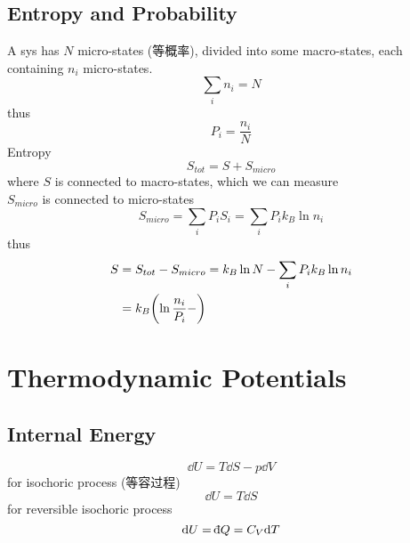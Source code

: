 \documentclass[UTF8]{ctexart} %
\newcommand{\dbar}{{\mathchar'26\mkern-11mu\mathrm{d}}}
\numberwithin{equation}{subsection}
\begin{document}
\subsection{}
\subsection{Entropy and Probability}
A sys has $N$ micro-states (等概率), divided into some macro-states, each containing $n_i$ micro-states.
\begin{equation}\label{key}
\sum_i n_i = N
\end{equation}
thus
\begin{equation}\label{key}
P_i = \dfrac{n_i}{N}
\end{equation}
Entropy
\begin{equation}\label{key}
S_{tot} = S + S_{micro}
\end{equation}
where $S$ is connected to macro-states, which we can measure\\
$S_{micro}$ is connected to micro-states
\begin{equation}\label{key}
S_{micro} = \sum_i P_i S_i = \sum_i P_i k_B \ln n_i
\end{equation}
thus
\begin{equation}\label{key}
\begin{aligned}
S &= S_{tot} - S_{micro} = k_B \ln N - \sum_i P_i k_B \ln n_i\\
&=k_B\qty(\ln\dfrac{n_i}{P_i} - )
\end{aligned}
\end{equation}

\section{}

\section{Thermodynamic Potentials}
\subsection{Internal Energy}
\begin{equation}\label{key}
\dd U = T\dd S - p\dd V
\end{equation}
for isochoric process (等容过程)
\begin{equation}\label{key}
\dd U = T\dd S
\end{equation}
for reversible isochoric process
\begin{equation}\label{key}
\dd U = \dbar Q = C_V\dd T
\end{equation}
\end{document}
